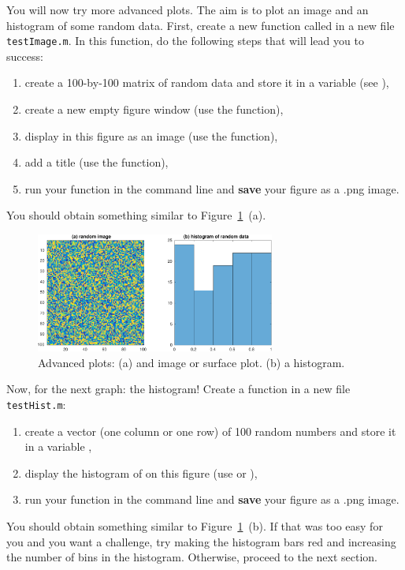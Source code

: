 \documentclass{article}
\begin{document}
You will now try more advanced plots.
The aim is to plot an image and an histogram of some random data.
First, create a new function called  in a new file \verb|testImage.m|.
In this function, do the following steps that will lead you to success:
\begin{enumerate}
  \item create a 100-by-100 matrix of random data and store it in a variable  (see ),
  \item create a new empty figure window (use the  function),
  \item display in this figure  as an image (use the  function),
  \item add a title (use the  function),
  \item run your function in the command line and \textbf{save} your figure as a .png image.
\end{enumerate}
You should obtain something similar to Figure~\ref{fig:adv}~(a).

\begin{figure}[h]
  \centering
  \includegraphics[width=0.7\textwidth]{advancedplot.pdf}
  \caption{Advanced plots: (a) and image or surface plot. (b) a histogram.}\label{fig:adv}
\end{figure}



Now, for the next graph: the histogram! Create a  function in a new file \verb|testHist.m|:
\begin{enumerate}
  \item create a vector (one column or one row) of 100 random numbers and store it in a variable ,
  \item display the histogram of  on this figure (use  or ),
  \item run your function in the command line and \textbf{save} your figure as a .png image.
\end{enumerate}
You should obtain something similar to Figure~\ref{fig:adv}~(b).
If that was too easy for you and you want a challenge, try making the histogram bars red and increasing the number of bins in the histogram.
Otherwise, proceed to the next section.
\end{document}

